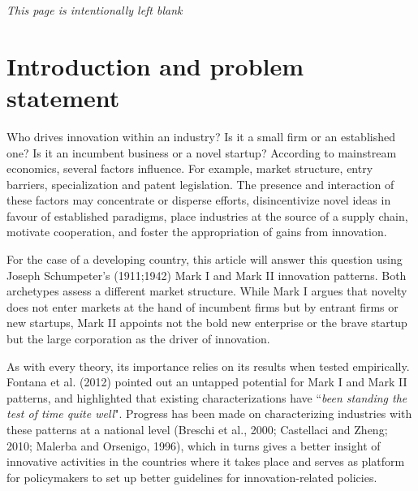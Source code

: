 \documentclass[12pt,a4paper]{article}
\begin{document}
\newpage

\vspace*{\fill}

\begin{center}
	\textit{This page is intentionally left blank}
\end{center}

\vspace*{\fill}

\pagebreak
	
	
\tableofcontents \newpage
\listoffigures
\listoftables \newpage
{}
\setcounter{page}{1}



\section{Introduction and problem statement}
	
Who drives innovation within an industry? Is it a small firm or an established one? Is it an incumbent business or a novel startup? According to mainstream economics, several factors influence. For example, market structure, entry barriers, specialization and patent legislation. The presence and interaction of these factors may concentrate or disperse efforts, disincentivize novel ideas in favour of established paradigms, place industries at the source of a supply chain, motivate cooperation, and foster the appropriation of gains from innovation.    

For the case of a developing country, this article will answer this question using Joseph Schumpeter’s (1911;1942) Mark I and Mark II innovation patterns. Both archetypes assess a different market structure. While Mark I argues that novelty does not enter markets at the hand of incumbent firms but by entrant firms or new startups, Mark II appoints not the bold new enterprise or the brave startup but the large corporation as the driver of innovation.  

As with every theory, its importance relies on its results when tested empirically. Fontana et al. (2012) pointed out an untapped potential for Mark I and Mark II patterns, and highlighted that existing characterizations have “\textit{been standing the test of time quite well}". Progress has been made on characterizing industries with these patterns at a national level (Breschi et al., 2000; Castellaci and Zheng; 2010; Malerba and Orsenigo, 1996), which in turns gives a better insight of innovative activities in the countries where it takes place and serves as platform for policymakers to set up better guidelines for innovation-related policies.  
\end{document}
